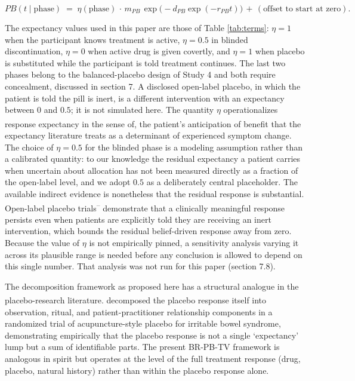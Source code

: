 \documentclass[
  11pt,
]{article}
\newcounter{none} %
\begin{document}
\[ PB(t \mid \text{phase}) \;=\; \eta(\text{phase}) \,\cdot\,
m_{PB}\,\exp\bigl(-d_{PB}\exp(-r_{PB} t)\bigr) \,+\, (\text{offset to start at
zero}). \]

The expectancy values used in this paper are those of Table
\ref{tab:terms}: \(\eta = 1\) when the participant knows treatment is
active, \(\eta = 0.5\) in blinded discontinuation, \(\eta = 0\) when active
drug is given covertly, and \(\eta = 1\) when placebo is substituted while
the participant is told treatment continues. The last two phases belong
to the balanced-placebo design of Study 4 and both require concealment,
discussed in section 7. A disclosed open-label placebo, in which the
patient is told the pill is inert, is a different intervention with an
expectancy between \(0\) and \(0.5\); it is not simulated here. The quantity \(\eta\) operationalizes
response expectancy in the sense of\textsuperscript{}, the patient's anticipation of
benefit that the expectancy literature treats as a determinant of experienced
symptom change. The choice of \(\eta = 0.5\) for the blinded phase is a modeling
assumption rather than a calibrated quantity: to our knowledge the residual
expectancy a patient carries when uncertain about allocation has not been
measured directly as a fraction of the open-label level, and we adopt \(0.5\) as
a deliberately central placeholder. The available indirect evidence is
nonetheless that the residual response is substantial. Open-label placebo
trials\textsuperscript{--} demonstrate that a
clinically meaningful response persists even when patients are explicitly told
they are receiving an inert intervention, which bounds the residual
belief-driven response away from zero. Because the value of \(\eta\) is not
empirically pinned, a sensitivity analysis varying it across its plausible
range is needed before any conclusion is allowed to depend on this single
number. That analysis was not run for this paper (section 7.8).

The decomposition framework as proposed here has a structural analogue in the
placebo-research literature.\textsuperscript{} decomposed the placebo
response itself into observation, ritual, and patient-practitioner
relationship components in a randomized trial of acupuncture-style placebo for
irritable bowel syndrome, demonstrating empirically that the placebo response
is not a single `expectancy' lump but a sum of identifiable parts. The present
BR-PB-TV framework is analogous in spirit but operates at the level of the
full treatment response (drug, placebo, natural history) rather than within
the placebo response alone.
\end{document}
